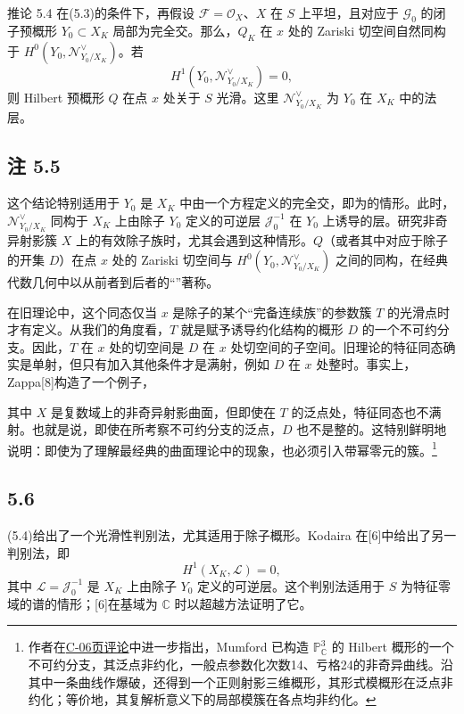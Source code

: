 \begin{statement}{推论 5.4}
在(5.3)的条件下，再假设 $\mathcal F=\mathcal O_X$、$X$ 在 $S$ 上平坦，且对应于 $\mathcal G_0$ 的闭子预概形 $Y_0\subset X_K$ 局部为完全交。那么，$Q_K$ 在 $x$ 处的 Zariski 切空间自然同构于 $H^0(Y_0,\mathcal N^\vee_{Y_0/X_K})$。若
\[
H^1(Y_0,\mathcal N^\vee_{Y_0/X_K})=0,
\]
则 Hilbert 预概形 $Q$ 在点 $x$ 处关于 $S$ 光滑。这里 $\mathcal N^\vee_{Y_0/X_K}$ 为 $Y_0$ 在 $X_K$ 中的法层。
\end{statement}

\subsection*{注 5.5}
这个结论特别适用于 $Y_0$ 是 $X_K$ 中由一个方程定义的完全交，即为的情形。此时，$\mathcal N^\vee_{Y_0/X_K}$ 同构于 $X_K$ 上由除子 $Y_0$ 定义的可逆层 $\mathcal J_0^{-1}$ 在 $Y_0$ 上诱导的层。研究非奇异射影簇 $X$ 上的有效除子族时，尤其会遇到这种情形。$Q$（或者其中对应于除子的开集 $D$）在点 $x$ 处的 Zariski 切空间与 $H^0(Y_0,\mathcal N^\vee_{Y_0/X_K})$ 之间的同构，在经典代数几何中以从前者到后者的“”著称。

在旧理论中，这个同态仅当 $x$ 是除子的某个“完备连续族”的参数簇 $T$ 的光滑点时才有定义。从我们的角度看，$T$ 就是赋予诱导约化结构的概形 $D$ 的一个不可约分支。因此，$T$ 在 $x$ 处的切空间是 $D$ 在 $x$ 处切空间的子空间。旧理论的特征同态确实是单射，但只有加入其他条件才是满射，例如 $D$ 在 $x$ 处整时。事实上，Zappa[8]构造了一个例子，

其中 $X$ 是复数域上的非奇异射影曲面，但即使在 $T$ 的泛点处，特征同态也不满射。也就是说，即使在所考察不可约分支的泛点，$D$ 也不是整的。这特别鲜明地说明：即使为了理解最经典的曲面理论中的现象，也必须引入带幂零元的簇。\footnote{作者在\hyperref[orig:8]{C-06页评论}中进一步指出，Mumford 已构造 $\mathbb P^3_{\mathbb C}$ 的 Hilbert 概形的一个不可约分支，其泛点非约化，一般点参数化次数14、亏格24的非奇异曲线。沿其中一条曲线作爆破，还得到一个正则射影三维概形，其形式模概形在泛点非约化；等价地，其复解析意义下的局部模簇在各点均非约化。}

\subsection*{5.6}
(5.4)给出了一个光滑性判别法，尤其适用于除子概形。Kodaira 在[6]中给出了另一判别法，即
\[
H^1(X_K,\mathcal L)=0,
\]
其中 $\mathcal L=\mathcal J_0^{-1}$ 是 $X_K$ 上由除子 $Y_0$ 定义的可逆层。这个判别法适用于 $S$ 为特征零域的谱的情形；[6]在基域为 $\mathbb C$ 时以超越方法证明了它。

